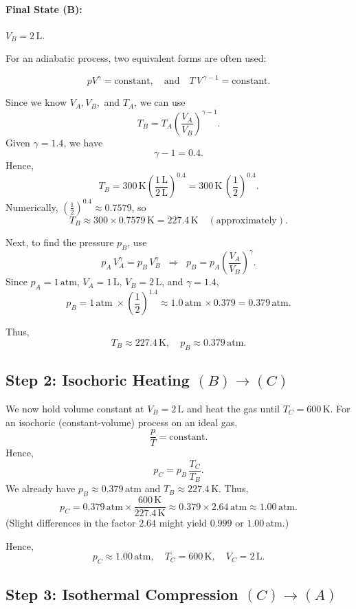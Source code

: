 \documentclass[12pt]{article}
\theoremstyle{definition} %
\theoremstyle{plain} %
\begin{document}
\paragraph{Final State (B):} $V_B = 2\,\mathrm{L}$.

For an adiabatic process, two equivalent forms are often used:

\[
 p V^\gamma = \text{constant},
 \quad\text{and}\quad
 T\,V^{\,\gamma -1} = \text{constant}.
\]

Since we know $V_A, V_B,$ and $T_A$, we can use
\[
 T_B = T_A \left(\frac{V_A}{V_B}\right)^{\gamma -1}.
\]
Given $\gamma = 1.4$, we have
\[
 \gamma -1 = 0.4.
\]
Hence,
\[
 T_B 
 = 300\,\mathrm{K}
   \left(\frac{1\,\mathrm{L}}{2\,\mathrm{L}}\right)^{0.4}
 = 300\,\mathrm{K}\,\left(\frac{1}{2}\right)^{0.4}.
\]
Numerically, $\left(\tfrac{1}{2}\right)^{0.4} \approx 0.7579$, so
\[
 T_B \approx 300 \times 0.7579 \,\mathrm{K}
 = 227.4\,\mathrm{K} \quad(\text{approximately}).
\]

Next, to find the pressure $p_B$, use
\[
 p_A \,V_A^\gamma = p_B \,V_B^\gamma
 \;\;\Longrightarrow\;\;
 p_B = p_A \left(\frac{V_A}{V_B}\right)^\gamma.
\]
Since $p_A=1\,\mathrm{atm}$, $V_A=1\,\mathrm{L}$, $V_B=2\,\mathrm{L}$, and $\gamma=1.4$,
\[
 p_B
 = 1\,\mathrm{atm}\;\times 
   \left(\frac{1}{2}\right)^{1.4}
 \approx 1.0\,\mathrm{atm}\,\times 0.379
 = 0.379\,\mathrm{atm}.
\]

Thus,
\[
 \boxed{
   T_B \approx 227.4\,\mathrm{K}, 
   \quad p_B \approx 0.379\,\mathrm{atm}.
 }
\]

\subsection*{Step 2: Isochoric Heating $(B)\to(C)$}

We now hold volume constant at $V_B=2\,\mathrm{L}$ and heat the gas until $T_C=600\,\mathrm{K}$. For an isochoric (constant-volume) process on an ideal gas,
\[
 \frac{p}{T} = \text{constant}.
\]
Hence,
\[
 p_C = p_B \,\frac{T_C}{T_B}.
\]
We already have $p_B\approx 0.379\,\mathrm{atm}$ and $T_B\approx 227.4\,\mathrm{K}$. Thus,
\[
 p_C
 = 0.379\,\mathrm{atm}
 \times \frac{600\,\mathrm{K}}{227.4\,\mathrm{K}}
 \approx 0.379 \times 2.64 \,\mathrm{atm}
 \approx 1.00\,\mathrm{atm}.
\]
(Slight differences in the factor $2.64$ might yield $0.999$ or $1.00$\,atm.)

Hence,
\[
 \boxed{
   p_C \approx 1.00\,\mathrm{atm}, 
   \quad T_C = 600\,\mathrm{K},
   \quad V_C = 2\,\mathrm{L}.
 }
\]

\subsection*{Step 3: Isothermal Compression $(C)\to(A)$}
\end{document}
